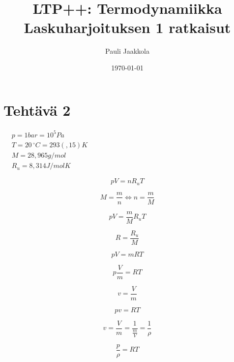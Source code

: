 \documentclass[12pt,a4paper,finnish]{article}
\title{LTP++: Termodynamiikka\\Laskuharjoituksen 1 ratkaisut}
\date{\today}
\author{Pauli Jaakkola}
\begin{document}
\maketitle

\section{Tehtävä 2}

\begin{math}
\begin{aligned}
 &p = 1bar = 10^5 Pa\\
 &T = 20\,^{\circ}C = 293(,15)K\\
 &M = 28,965 g/mol\\
 &R_u = 8,314 J/molK
\end{aligned}
\end{math}

\begin{equation}
 pV = nR_uT
\end{equation}

\begin{equation}
 M = \frac{m}{n} \Leftrightarrow n = \frac{m}{M}
\end{equation}

\begin{equation}
 pV = \frac{m}{M}R_uT
\end{equation}
 
\begin{equation}
R = \frac{R_u}{M}
\end{equation}

\begin{equation}
 pV = mRT
\end{equation}

\begin{equation}
 p\frac{V}{m} = RT
\end{equation}

\begin{equation}
v = \frac{V}{m}
\end{equation}

\begin{equation}
\label{eq:pvRT}
 pv = RT
\end{equation}

\begin{equation}
 v = \frac{V}{m} = \frac{1}{\frac{m}{V}} = \frac{1}{\rho}
\end{equation}

\begin{equation}
 \frac{p}{\rho} = RT
\end{equation}
\end{document}
